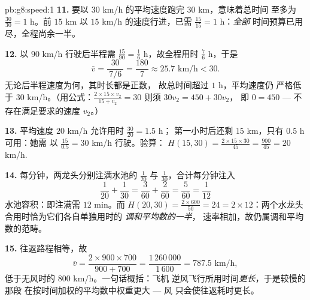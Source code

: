 \begin{solution}{pb:g8:speed:1}
\textbf{11.} 要以 $30$ km/h 的平均速度跑完 $30$ km，意味着总时间
至多为 $\frac{30}{30} = 1$ h。前 $15$ km 以 $15$ km/h
的速度行进，已需 $\frac{15}{15} = 1$ h：\emph{全部}
时间预算已用尽，全程尚余一半。

\textbf{12.} 以 $90$ km/h 行驶后半程需
$\frac{15}{90} = \frac16$ h，故全程用时 $\frac76$ h，于是
\[
\bar v = \frac{30}{\ 7/6\ } = \frac{180}{7} \approx 25.7
\text{ km/h} < 30 .
\]
无论后半程速度为何，其时长都是正数，
故总时间超过 $1$ h，平均速度仍
严格低于 $30$ km/h。（用公式：$\frac{2 \times 15
\times v_2}{15 + v_2} = 30$ 则须 $30 v_2 = 450 + 30 v_2$，
即 $0 = 450$ --- 不存在满足要求的速度 $v_2$。）

\textbf{13.} 平均速度 $20$ km/h 允许用时 $\frac{30}{20} = 1.5$ h；
第一小时后还剩 $15$ km，只有 $0.5$ h 可用：她需
以 $\frac{15}{0.5} = 30$ km/h 行驶。验算：
$H(15, 30) = \frac{2 \times 15 \times 30}{45} = \frac{900}{45}
= 20$ km/h.

\textbf{14.} 每分钟，两龙头分别注满水池的 $\frac{1}{20}$ 与
$\frac{1}{30}$，合计每分钟注入
\[
\frac{1}{20} + \frac{1}{30}
= \frac{3}{60} + \frac{2}{60}
= \frac{5}{60} = \frac{1}{12}
\]
水池容积：即注满需 $12$ min。而
$H(20, 30) = \frac{2 \times 600}{50} = 24 = 2 \times 12$：两个水龙头
合用时恰为它们各自单独用时的 \emph{调和平均数的一半}，
速率相加，故仍属调和平均数的范畴。

\textbf{15.} 往返路程相等，故
\[
\bar v = \frac{2 \times 900 \times 700}{900 + 700}
= \frac{1\,260\,000}{1\,600} = 787.5 \text{ km/h},
\]
低于无风时的 $800$ km/h。一句话概括：飞机
逆风飞行所用时间\emph{更长}，于是较慢的那段
在按时间加权的平均数中权重更大 --- 风
只会使往返耗时更长。
\end{solution}
